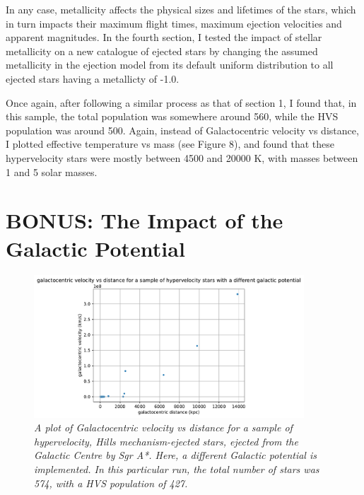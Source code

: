 \documentclass{article}
\begin{document}
In any case, metallicity affects the physical sizes and lifetimes of the stars, which in turn impacts their maximum flight times, maximum ejection velocities and apparent magnitudes. In the fourth section, I tested the impact of stellar metallicity on a new catalogue of ejected stars by changing the assumed metallicity in the ejection model from its default uniform distribution to all ejected stars having a metallicty of -1.0.

Once again, after following a similar process as that of section 1, I found that, in this sample, the total population was somewhere around 560, while the HVS population was around 500. Again, instead of Galactocentric velocity vs distance, I plotted effective temperature vs mass (see Figure 8), and found that these hypervelocity stars were mostly between 4500 and 20000 K, with masses between 1 and 5 solar masses.

\section{BONUS: The Impact of the Galactic Potential}

\begin{figure}[h!]
\caption{\textit{A plot of Galactocentric velocity vs distance for a sample of hypervelocity, Hills mechanism-ejected stars, ejected from the Galactic Centre by Sgr A*. Here, a different Galactic potential is implemented. In this particular run, the total number of stars was 574, with a HVS population of 427.}}
\centering
\includegraphics[width=0.9\textwidth]{GCv_vs_GCdist_hyp_5a.pdf}
\end{figure}
\end{document}
